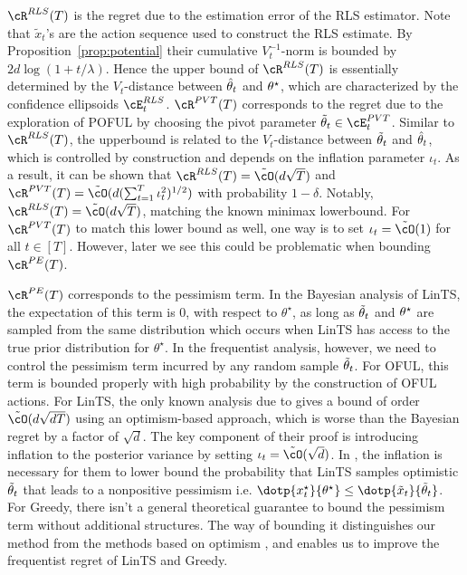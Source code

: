 $\cR^{RLS}(T)$ is the regret due to the estimation error of the RLS estimator. Note that $\tilde{x}_t$'s are the action sequence used to construct the RLS estimate. By Proposition~\ref{prop:potential} their cumulative $V_t^{-1}$-norm is bounded by $2d\log(1+t/\lambda)$. Hence the upper bound of $\cR^{RLS}(T)$ is essentially determined by the $V_t$-distance between $\hat{\theta}_t$ and $\theta^\star$, which are characterized by the confidence ellipsoids $\cE^{RLS}_t$. $\cR^{\PVT}(T)$ corresponds to the regret due to the exploration of POFUL by choosing the pivot parameter $\tilde{\theta}_t\in\cE^{\PVT}_t$. Similar to  $\cR^{RLS}(T)$, the upperbound is related to the $V_t$-distance between $\tilde{\theta}_t$ and $\hat{\theta}_t$, which is controlled by construction and depends on the inflation parameter $\iota_t$. As a result, it can be shown that 
$\cR^{RLS}(T)  = \tilde{\cO}(d\sqrt{T}) $ and $\cR^{\PVT}(T)  = \tilde{\cO}(d(\sum_{t = 1}^T \iota_{t}^2)^{1/2}) $ with probability $1-\delta$.  Notably, $\cR^{RLS}(T) = \tilde{\cO}(d\sqrt{T})  $, matching the known minimax lowerbound. For $\cR^{\PVT}(T)$ to match this lower bound as well, one way is to set $\iota_{t}=
\tilde{\cO}(1)$ for all $t\in[T]$. However, later we see this could be problematic when bounding $\cR^{PE}(T)$.

$\cR^{PE}(T)$ corresponds to the pessimism term.  In the Bayesian analysis of LinTS, the expectation of this term is $0$, with respect to $\theta^\star$, as long as $\tilde{\theta}_t$ and $\theta^\star$ are sampled from the same distribution which occurs when LinTS has access to the true prior distribution for $\theta^\star$. In the frequentist analysis, however, we need to control the pessimism term incurred by any random sample $\tilde{\theta}_t$. For OFUL, this term is bounded properly with high probability by the construction of OFUL actions. For LinTS, the only known analysis due to \cite{agrawal2013thompson,abeille2017linear} gives a bound of order $\tilde{\cO}(d\sqrt{dT})$ using an optimism-based approach, which is worse than the Bayesian regret by a factor of $\sqrt{d}$. The key component of their proof is introducing inflation to the posterior variance by setting $\iota_t =\tilde{\cO}(\sqrt{d})$. In \cite{abeille2017linear},  the inflation is necessary for them to lower bound the probability that LinTS samples optimistic $\tilde{\theta}_t$ that leads to a nonpositive pessimism i.e. $\dotp{x_t^\star}{ \theta^{\star}}\leq \dotp{\tilde{x}_t}{\tilde{\theta}_t}$. For Greedy, there isn't a general theoretical guarantee to bound the pessimism term without additional structures. The way of bounding it distinguishes our method from the methods based on optimism \citep{agrawal2013thompson,abeille2017linear}, and enables us to improve the frequentist regret of LinTS and Greedy. 

